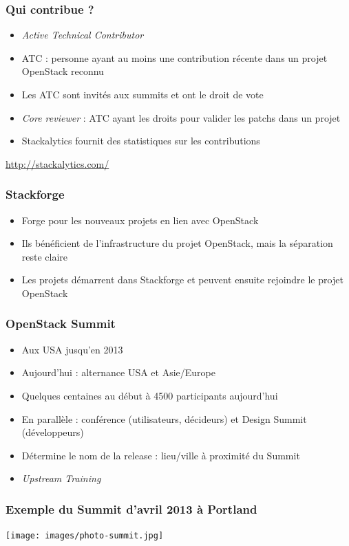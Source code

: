  \begin{frame}
    \frametitle{Qui contribue ?}
    \begin{itemize}
      \item \textit{Active Technical Contributor}
      \item ATC : personne ayant au moins une contribution récente dans un projet OpenStack reconnu
      \item Les ATC sont invités aux summits et ont le droit de vote
      \item \textit{Core reviewer} : ATC ayant les droits pour valider les patchs dans un projet
      \item Stackalytics fournit des statistiques sur les contributions
    \end{itemize}
    \url{http://stackalytics.com/}
  \end{frame}

  \begin{frame}
    \frametitle{Stackforge}
    \begin{itemize}
      \item Forge pour les nouveaux projets en lien avec OpenStack
      \item Ils bénéficient de l'infrastructure du projet OpenStack, mais la séparation reste claire
      \item Les projets démarrent dans Stackforge et peuvent ensuite rejoindre le projet OpenStack
    \end{itemize}
  \end{frame}

  \begin{frame}
    \frametitle{OpenStack Summit}
    \begin{itemize}
      \item Aux USA jusqu'en 2013
      \item Aujourd'hui : alternance USA et Asie/Europe
      \item Quelques centaines au début à 4500 participants aujourd'hui
      \item En parallèle : conférence (utilisateurs, décideurs) et Design Summit (développeurs)
      \item Détermine le nom de la release : lieu/ville à proximité du Summit
      \item \textit{Upstream Training}
    \end{itemize}
  \end{frame}

  \begin{frame}
    \frametitle{Exemple du Summit d'avril 2013 à Portland}
    \texttt{[image: images/photo-summit.jpg]}
  \end{frame}

